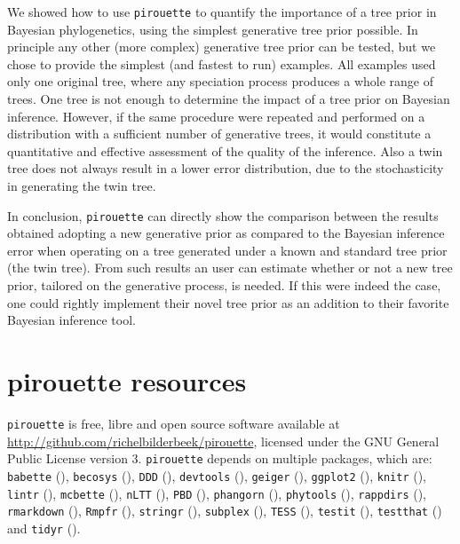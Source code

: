 We showed how to use \verb;pirouette; to quantify the importance of a 
tree prior in Bayesian phylogenetics, using the simplest generative tree 
prior possible.
In principle any other (more complex) generative tree prior can be tested, 
but we chose to provide the simplest (and fastest to run) examples.
All examples used only one original tree,
where any speciation process produces a whole range of trees.
One tree is not enough to determine the impact of a tree prior 
on Bayesian inference.
However, if the same procedure were repeated and performed on a 
distribution with a sufficient number of generative trees, 
it would constitute a quantitative and effective assessment of the 
quality of the inference.
Also a twin tree does not always result in a lower error distribution,
due to the stochasticity in generating the twin tree.

In conclusion, \verb;pirouette; can directly show the comparison 
between the results obtained 
adopting a new generative prior as compared to the Bayesian inference error
when operating on a tree generated under a known and standard tree 
prior (the twin tree).
From such results an user can estimate whether or not a new tree prior, 
tailored on the generative process, is needed. 
If this were indeed the case, one could rightly implement 
their novel tree prior as an addition to 
their favorite Bayesian inference tool.

\section{pirouette resources}

\verb;pirouette; is free, libre and open source software available at 
\url{http://github.com/richelbilderbeek/pirouette},
licensed under the GNU General Public License version 3.
\verb;pirouette; depends on multiple packages, which are:
\verb;babette; (\cite{bilderbeek2018babette}),
\verb;becosys; (\cite{becosys}),
\verb;DDD; (\cite{DDD}),
\verb;devtools; (\cite{devtools}),
\verb;geiger; (\cite{geiger}),
\verb;ggplot2; (\cite{ggplot2}),
\verb;knitr; (\cite{knitr}),
\verb;lintr; (\cite{lintr}),
\verb;mcbette; (\cite{mcbette}),
\verb;nLTT; (\cite{nLTT}),
\verb;PBD; (\cite{PBD}),
\verb;phangorn; (\cite{phangorn}),
\verb;phytools; (\cite{phytools}),
\verb;rappdirs; (\cite{rappdirs}),
\verb;rmarkdown; (\cite{rmarkdown}),
\verb;Rmpfr; (\cite{Rmpfr}),
\verb;stringr; (\cite{stringr}),
\verb;subplex; (\cite{subplex}),
\verb;TESS; (\cite{TESS}),
\verb;testit; (\cite{testit}), 
\verb;testthat; (\cite{testthat}) and
\verb;tidyr; (\cite{tidyr}).

